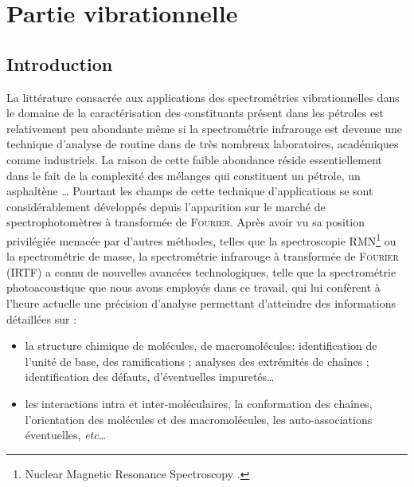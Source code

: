 \chapter{Partie vibrationnelle}
\minitoc
\restoregeometry

\newpage



\section*{Introduction}

La littérature consacrée aux applications des spectrométries vibrationnelles dans le domaine de la caractérisation des constituants présent dans les pétroles est relativement peu abondante même si la spectrométrie infrarouge est devenue une technique d'analyse de \og routine \fg{} dans de très nombreux laboratoires, académiques comme industriels. La raison de cette faible abondance réside essentiellement dans le fait de la complexité des mélanges qui constituent un pétrole, un asphaltène … Pourtant les champs de cette technique d'applications se sont considérablement développés depuis l'apparition sur le marché de spectrophotomètres à transformée de \textsc{Fourier}.
Après avoir vu sa position privilégiée menacée par d'autres méthodes, telles que la spectroscopie RMN\footnote{\og Nuclear Magnetic Resonance Spectroscopy \fg{}.} ou la spectrométrie de masse, la spectrométrie infrarouge à transformée de \textsc{Fourier} (IRTF) a connu de nouvelles avancées technologiques, telle que la spectrométrie photoacoustique que nous avons employés dans ce travail, qui lui confèrent à l'heure actuelle une précision d'analyse permettant d'atteindre des informations détaillées sur :

\begin{itemize}
	\item la structure chimique de molécules, de macromolécules: identification de l'unité de base, des ramifications ; analyses des extrémités de chaînes ; identification des défauts, d'éventuelles impuretés\dots{}
	\item les interactions intra et inter-moléculaires, la conformation des chaînes, l'orientation des molécules et des macromolécules, les auto-associations éventuelles, \textit{etc}\dots{}
\end{itemize}

